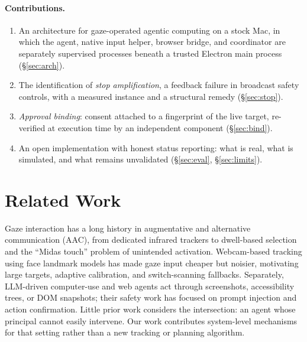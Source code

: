 \documentclass[11pt]{article}
\begin{document}
\paragraph{Contributions.}
\begin{enumerate}[leftmargin=*,itemsep=2pt]
\item An architecture for gaze-operated agentic computing on a stock Mac, in which the agent, native input helper, browser bridge, and coordinator are separately supervised processes beneath a trusted Electron main process (\S\ref{sec:arch}).
\item The identification of \emph{stop amplification}, a feedback failure in broadcast safety controls, with a measured instance and a structural remedy (\S\ref{sec:stop}).
\item \emph{Approval binding}: consent attached to a fingerprint of the live target, re-verified at execution time by an independent component (\S\ref{sec:bind}).
\item An open implementation with honest status reporting: what is real, what is simulated, and what remains unvalidated (\S\ref{sec:eval}, \S\ref{sec:limits}).
\end{enumerate}

\section{Related Work}
Gaze interaction has a long history in augmentative and alternative communication (AAC), from dedicated infrared trackers to dwell-based selection and the ``Midas touch'' problem of unintended activation. Webcam-based tracking using face landmark models has made gaze input cheaper but noisier, motivating large targets, adaptive calibration, and switch-scanning fallbacks. Separately, LLM-driven computer-use and web agents act through screenshots, accessibility trees, or DOM snapshots; their safety work has focused on prompt injection and action confirmation. Little prior work considers the intersection: an agent whose principal cannot easily intervene. Our work contributes system-level mechanisms for that setting rather than a new tracking or planning algorithm.
\end{document}
